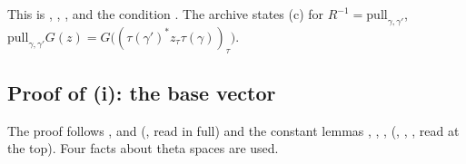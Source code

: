 \documentclass[11pt]{article}
\theoremstyle{definition}
\theoremstyle{remark}
\begin{document}
\noindent This is , , ,  and the condition . The archive states (c) for $R^{-1}=\mathrm{pull}_{\gamma,\gamma'}$, $\mathrm{pull}_{\gamma,\gamma'}G(z)=G\bigl((\tau(\gamma')^*z_\tau\tau(\gamma))_\tau\bigr)$.

\subsection{Proof of (i): the base vector}\label{sec:A1}

The proof follows ,  and  (, read in full) and the constant lemmas , , ,  (, , , read at the top). Four facts about theta spaces are used.
\end{document}
